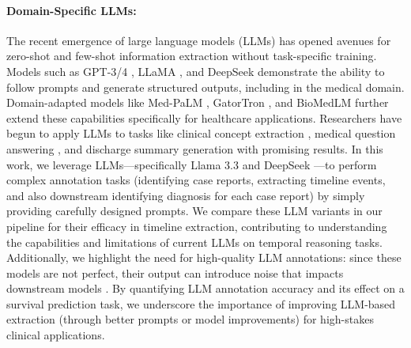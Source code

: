 \paragraph{Domain-Specific LLMs:} 
The recent emergence of large language models (LLMs) has opened avenues for zero-shot and few-shot information extraction without task-specific training.
Models such as GPT-3/4 \cite{brown2020language, achiam2023gpt}, LLaMA \cite{touvron2023llama}, and DeepSeek \cite{guo2025deepseek} demonstrate the ability to follow prompts and generate structured outputs, including in the medical domain.
Domain-adapted models like Med-PaLM \cite{singhal2025toward}, GatorTron \cite{yang2022gatortron}, and BioMedLM \cite{bolton2024biomedlm} further extend these capabilities specifically for healthcare applications.
Researchers have begun to apply LLMs to tasks like clinical concept extraction \cite{bhagat2024large}, medical question answering \cite{singhal2025toward}, and discharge summary generation \cite{patel2023chatgpt} with promising results.
In this work, we leverage LLMs—specifically Llama 3.3 \cite{grattafiori2024llama} and DeepSeek \cite{guo2025deepseek}—to perform complex annotation tasks (identifying case reports, extracting timeline events, and also downstream identifying diagnosis for each case report) by simply providing carefully designed prompts.
We compare these LLM variants in our pipeline for their efficacy in timeline extraction, contributing to understanding the capabilities and limitations of current LLMs on temporal reasoning tasks.
Additionally, we highlight the need for high-quality LLM annotations: since these models are not perfect, their output can introduce noise that impacts downstream models \cite{omiye2024large}.
By quantifying LLM annotation accuracy and its effect on a survival prediction task, we underscore the importance of improving LLM-based extraction (through better prompts or model improvements) for high-stakes clinical applications.

